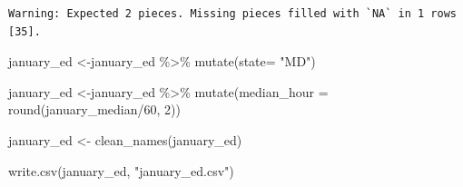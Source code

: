 \documentclass[
  letterpaper,
  DIV=11,
  numbers=noendperiod]{scrartcl}
\newenvironment{Shaded}{\begin{snugshade}}{\end{snugshade}}
\newcommand{\AttributeTok}[1]{\textcolor[rgb]{0.40,0.45,0.13}{#1}}
\newcommand{\DecValTok}[1]{\textcolor[rgb]{0.68,0.00,0.00}{#1}}
\newcommand{\FunctionTok}[1]{\textcolor[rgb]{0.28,0.35,0.67}{#1}}
\newcommand{\NormalTok}[1]{\textcolor[rgb]{0.00,0.23,0.31}{#1}}
\newcommand{\OtherTok}[1]{\textcolor[rgb]{0.00,0.23,0.31}{#1}}
\newcommand{\SpecialCharTok}[1]{\textcolor[rgb]{0.37,0.37,0.37}{#1}}
\newcommand{\StringTok}[1]{\textcolor[rgb]{0.13,0.47,0.30}{#1}}
\begin{document}
\begin{verbatim}
Warning: Expected 2 pieces. Missing pieces filled with `NA` in 1 rows [35].
\end{verbatim}

\begin{Shaded}
\begin{Highlighting}[]
\NormalTok{january\_ed }\OtherTok{\textless{}{-}}\NormalTok{january\_ed }\SpecialCharTok{\%\textgreater{}\%} 
  \FunctionTok{mutate}\NormalTok{(}\AttributeTok{state=} \StringTok{"MD"}\NormalTok{)}

\NormalTok{january\_ed }\OtherTok{\textless{}{-}}\NormalTok{january\_ed }\SpecialCharTok{\%\textgreater{}\%} 
  \FunctionTok{mutate}\NormalTok{(}\AttributeTok{median\_hour =} \FunctionTok{round}\NormalTok{(january\_median}\SpecialCharTok{/}\DecValTok{60}\NormalTok{, }\DecValTok{2}\NormalTok{))}
  
\NormalTok{january\_ed }\OtherTok{\textless{}{-}} \FunctionTok{clean\_names}\NormalTok{(january\_ed)}

\FunctionTok{write.csv}\NormalTok{(january\_ed, }\StringTok{"january\_ed.csv"}\NormalTok{)}
\end{Highlighting}
\end{Shaded}
\end{document}
